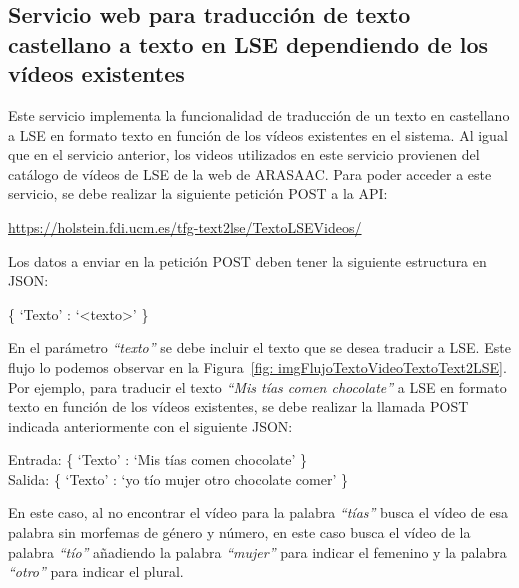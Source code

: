 \subsection{Servicio web para traducción de texto castellano a texto en LSE dependiendo de los vídeos existentes}

Este servicio implementa la funcionalidad de traducción de un texto en castellano a LSE en formato texto en función de los vídeos existentes en el sistema. Al igual que en el servicio anterior, los videos utilizados en este servicio provienen del catálogo de vídeos de LSE de la web de ARASAAC. Para poder acceder a este servicio, se debe realizar la siguiente petición POST a la API:\\

\begin{shaded}
	\url{https://holstein.fdi.ucm.es/tfg-text2lse/TextoLSEVideos/  }	
\end{shaded}


Los datos a enviar en la petición POST deben tener la siguiente estructura en JSON: 
\begin{center}
	
	\{ `Texto' : `<texto>' \}
	
\end{center}


En el parámetro \textit{``texto''} se debe incluir el texto que se desea traducir a LSE. Este flujo lo podemos observar en la Figura~\ref {fig: imgFlujoTextoVideoTextoText2LSE}.\\

Por ejemplo, para traducir el texto \textit{``Mis tías comen chocolate''} a LSE en formato texto en función de los vídeos existentes, se debe realizar la llamada POST indicada anteriormente con el siguiente JSON:


\begin{center}
	Entrada: \{ `Texto' : `Mis tías comen chocolate' \} \\
	Salida: \{ `Texto' : `yo tío mujer otro chocolate comer' \}
\end{center}

En este caso, al no encontrar el vídeo para la palabra \textit{``tías''} busca el vídeo de esa palabra sin morfemas de género y número, en este caso busca el vídeo de la palabra \textit{``tío''} añadiendo la palabra  \textit{``mujer''} para indicar el femenino y la palabra  \textit{``otro''} para indicar el plural.


